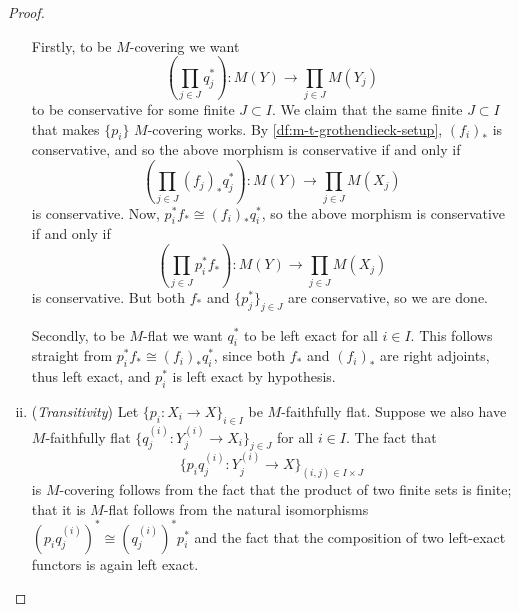 \begin{proof}
\begin{enumerate}[(i)]
                    Firstly, to be $M$-covering we want
                    \begin{equation*}
                        \left(\prod_{j\in J} q_j^*\right)\colon M(Y)\to \prod_{j\in J} M(Y_j)
                    \end{equation*}
                    to be conservative for some finite $J\subset I$.
                    We claim that the same finite $J\subset I$ that makes $\{p_i\}$ $M$-covering works.
                    By \cref{df:m-t-grothendieck-setup}, $(f_i)_*$ is conservative, and so the above morphism is conservative if and only if
                    \begin{equation*}
                        \left(\prod_{j\in J} (f_j)_*q_j^*\right)\colon M(Y)\to \prod_{j\in J} M(X_j)
                    \end{equation*}
                    is conservative.
                    Now, $p_i^*f_*\cong(f_i)_*q_i^*$, so the above morphism is conservative if and only if
                    \begin{equation*}
                        \left(\prod_{j\in J} p_i^* f_*\right)\colon M(Y)\to \prod_{j\in J} M(X_j)
                    \end{equation*}
                    is conservative.
                    But both $f_*$ and $\{p_j^*\}_{j\in J}$ are conservative, so we are done.

                    Secondly, to be $M$-flat we want $q_i^*$ to be left exact for all $i\in I$.
                    This follows straight from $p_i^*f_*\cong(f_i)_*q_i^*$, since both $f_*$ and $(f_i)_*$ are right adjoints, thus left exact, and $p_i^*$ is left exact by hypothesis.
                \item (\emph{Transitivity})
                    Let $\{p_i\colon X_i\to X\}_{i\in I}$ be $M$-faithfully flat.
                    Suppose we also have $M$-faithfully flat $\{q^{(i)}_j\colon Y^{(i)}_j\to X_i\}_{j\in J}$ for all $i\in I$.
                    The fact that
                    \begin{equation*}
                        \{p_iq^{(i)}_j\colon Y^{(i)}_j\to X\}_{(i,j)\in I\times J}
                    \end{equation*}
                    is $M$-covering follows from the fact that the product of two finite sets is finite; that it is $M$-flat follows from the natural isomorphisms $(p_i q^{(i)}_j)^*\cong (q^{(i)}_j)^* p_i^*$ and the fact that the composition of two left-exact functors is again left exact.\qedhere
            \end{enumerate}
        \end{proof}

